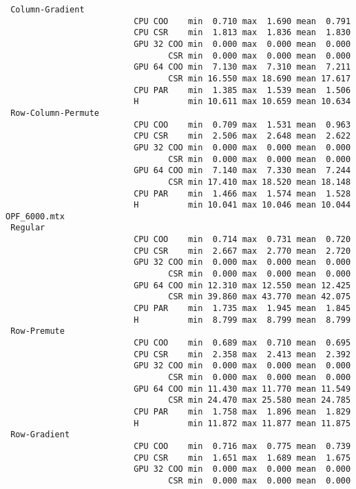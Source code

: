 \begin{verbatim}
 Column-Gradient
                          CPU COO    min  0.710 max  1.690 mean  0.791
                          CPU CSR    min  1.813 max  1.836 mean  1.830
                          GPU 32 COO min  0.000 max  0.000 mean  0.000
                                 CSR min  0.000 max  0.000 mean  0.000
                          GPU 64 COO min  7.130 max  7.310 mean  7.211
                                 CSR min 16.550 max 18.690 mean 17.617
                          CPU PAR    min  1.385 max  1.539 mean  1.506
                          H          min 10.611 max 10.659 mean 10.634
 Row-Column-Permute
                          CPU COO    min  0.709 max  1.531 mean  0.963
                          CPU CSR    min  2.506 max  2.648 mean  2.622
                          GPU 32 COO min  0.000 max  0.000 mean  0.000
                                 CSR min  0.000 max  0.000 mean  0.000
                          GPU 64 COO min  7.140 max  7.330 mean  7.244
                                 CSR min 17.410 max 18.520 mean 18.148
                          CPU PAR    min  1.466 max  1.574 mean  1.528
                          H          min 10.041 max 10.046 mean 10.044
OPF_6000.mtx
 Regular
                          CPU COO    min  0.714 max  0.731 mean  0.720
                          CPU CSR    min  2.667 max  2.770 mean  2.720
                          GPU 32 COO min  0.000 max  0.000 mean  0.000
                                 CSR min  0.000 max  0.000 mean  0.000
                          GPU 64 COO min 12.310 max 12.550 mean 12.425
                                 CSR min 39.860 max 43.770 mean 42.075
                          CPU PAR    min  1.735 max  1.945 mean  1.845
                          H          min  8.799 max  8.799 mean  8.799
 Row-Premute
                          CPU COO    min  0.689 max  0.710 mean  0.695
                          CPU CSR    min  2.358 max  2.413 mean  2.392
                          GPU 32 COO min  0.000 max  0.000 mean  0.000
                                 CSR min  0.000 max  0.000 mean  0.000
                          GPU 64 COO min 11.430 max 11.770 mean 11.549
                                 CSR min 24.470 max 25.580 mean 24.785
                          CPU PAR    min  1.758 max  1.896 mean  1.829
                          H          min 11.872 max 11.877 mean 11.875
 Row-Gradient
                          CPU COO    min  0.716 max  0.775 mean  0.739
                          CPU CSR    min  1.651 max  1.689 mean  1.675
                          GPU 32 COO min  0.000 max  0.000 mean  0.000
                                 CSR min  0.000 max  0.000 mean  0.000

\end{verbatim}
